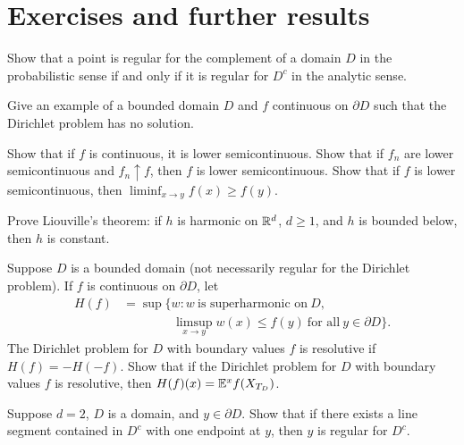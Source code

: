 \section{Exercises and further results}\label{ch2_sec8}

\begin{exercise}\label{ex:ch2_1}
Show that a point is regular for the complement of a domain $D$ in the probabilistic sense if and only if it is regular for $D^c$ in the analytic sense.
\end{exercise}

\begin{exercise}\label{ex:ch2_2}
Give an example of a bounded domain $D$ and $f$ continuous on $\partial D$ such that the Dirichlet problem has no solution.
\end{exercise}

\begin{exercise}\label{ex:ch2_3}
Show that if $f$ is continuous, it is lower semicontinuous. Show that if $f_n$ are lower semicontinuous and $f_n \uparrow f$, then $f$ is lower semicontinuous. Show that if $f$ is lower semicontinuous, then $\liminf_{x\to y} f(x) \geq f(y)$.
\end{exercise}

\begin{exercise}\label{ex:ch2_4}
Prove Liouville's theorem: if $h$ is harmonic on $\mathbb{R}^d$, $d \geq 1$, and $h$ is bounded below, then $h$ is constant.
\end{exercise}

\begin{exercise}\label{ex:ch2_5}
Suppose $D$ is a bounded domain (not necessarily regular for the Dirichlet problem). If $f$ is continuous on $\partial D$, let
\begin{align*}
    H(f) &= \sup\{w : w~\text{is superharmonic on}~D, \\
    &\qquad\qquad\limsup_{x\to y} w(x) \leq f(y)~\text{for all}~y \in \partial D\}.
\end{align*}
The Dirichlet problem for $D$ with boundary values $f$ is resolutive if $H(f) = -H(-f)$. Show that if the Dirichlet problem for $D$ with boundary values $f$ is resolutive, then $H(f)(x) = \mathbb{E}^x f(X_{T_D})$.
\end{exercise}

\begin{exercise}\label{ex:ch2_6}
Suppose $d = 2$, $D$ is a domain, and $y \in \partial D$. Show that if there exists a line segment contained in $D^c$ with one endpoint at $y$, then $y$ is regular for $D^c$.
\end{exercise}

